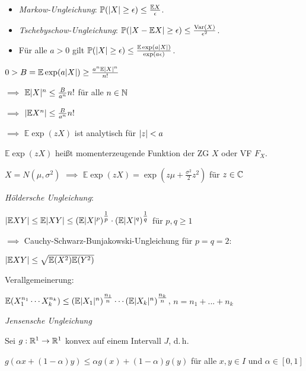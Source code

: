 \documentclass{cheat-sheet}
\renewcommand{\P}{\mathbb{P}} %
\newcommand{\E}{\mathbb{E}} %
\newcommand{\Var}{\mathrm{Var}} %
\begin{document}
\begin{kor}
  \begin{itemize}
    \item \emph{Markow-Ungleichung}: $\P(\abs{X} \geq \epsilon) \leq \tfrac{\E X}{\epsilon}$.
    \item \emph{Tschebyschow-Ungleichung}: $\P(\abs{X - \E X} \geq \epsilon) \leq \frac{\Var(X)}{\epsilon^2}$.
    \item Für alle $a > 0$ gilt $\P(\abs{X} \geq \epsilon) \leq \tfrac{\E \exp(a \abs{X})}{\exp(a\epsilon) }$.
  \end{itemize}
\end{kor}













$0 > B = \E \exp(a \abs{X}) \geq \frac{a^n \E \abs{X}^n}{n!}$

$\implies$ $\E \abs{X}^n \leq \tfrac{B}{a^n} n!$ für alle $n \in \mathbb{N}$

$\implies$ $\abs{\E X^n} \leq \tfrac{B}{a^n} n!$

$\implies$ $\E \exp(z X)$ ist analytisch für $\lvert z\rvert < a$

\begin{defn}
  $\E \exp(z X)$ heißt momenterzeugende Funktion der ZG $X$ oder VF $F_X$.
\end{defn}

$X = N(\mu, \sigma^2)$ $\implies$ $\E \exp(z X) = \exp\left( z\mu + \tfrac{\sigma^2}{2} z^2 \right)$ für $z \in \mathbb{C}$

\emph{Höldersche Ungleichung}:

$\abs{\E X Y} \leq \E \abs{XY} \leq (\E \abs{X}^p)^{\tfrac{1}{p}} \cdot (\E \abs{X}^q)^{\tfrac{1}{q}}$ für $p, q \geq 1$

$\implies$ Cauchy-Schwarz-Bunjakowski-Ungleichung für $p = q = 2$:

$\abs{\E XY} \leq \sqrt{ \E (X^2) \E(Y^2) }$

Verallgemeinerung:

$\E(X_1^{n_1} \cdots X_k^{n_k}) \leq (\E \abs{X_1}^n)^{\tfrac{n_1}{n}} \cdots (\E \abs{X_k}^n)^{\tfrac{n_k}{n}}$, $n = n_1 + ... + n_k$

\emph{Jensensche Ungleichung}

Sei $g : \mathbb{R}^1 \to \mathbb{R}^1$ konvex auf einem Intervall $J$, d.\,h.

$g(\alpha x + (1-\alpha)y) \leq \alpha g(x) + (1-\alpha) g(y)$ für alle $x, y \in I$ und $\alpha \in [0,1]$
\end{document}
